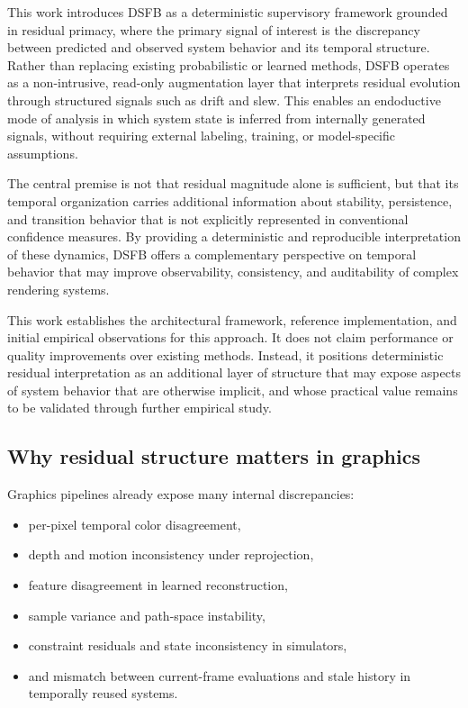 \documentclass[11pt,letterpaper]{article}
\theoremstyle{gcresult}
\theoremstyle{definition}
\begin{document}
This work introduces DSFB as a deterministic supervisory framework grounded in residual primacy, where the primary signal of interest is the discrepancy between predicted and observed system behavior and its temporal structure. Rather than replacing existing probabilistic or learned methods, DSFB operates as a non-intrusive, read-only augmentation layer that interprets residual evolution through structured signals such as drift and slew. This enables an endoductive mode of analysis in which system state is inferred from internally generated signals, without requiring external labeling, training, or model-specific assumptions.

The central premise is not that residual magnitude alone is sufficient, but that its temporal organization carries additional information about stability, persistence, and transition behavior that is not explicitly represented in conventional confidence measures. By providing a deterministic and reproducible interpretation of these dynamics, DSFB offers a complementary perspective on temporal behavior that may improve observability, consistency, and auditability of complex rendering systems.

This work establishes the architectural framework, reference implementation, and initial empirical observations for this approach. It does not claim performance or quality improvements over existing methods. Instead, it positions deterministic residual interpretation as an additional layer of structure that may expose aspects of system behavior that are otherwise implicit, and whose practical value remains to be validated through further empirical study.


\subsection{Why residual structure matters in graphics}

Graphics pipelines already expose many internal discrepancies:
\begin{itemize}[leftmargin=1.5em]
    \item per-pixel temporal color disagreement,
    \item depth and motion inconsistency under reprojection,
    \item feature disagreement in learned reconstruction,
    \item sample variance and path-space instability,
    \item constraint residuals and state inconsistency in simulators,
    \item and mismatch between current-frame evaluations and stale history in temporally reused systems.
\end{itemize}
\end{document}
